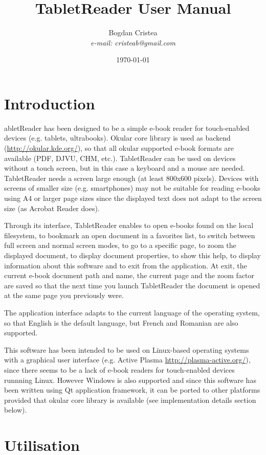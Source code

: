\documentclass[journal,12pt]{IEEEtran}
\title{TabletReader User Manual}
\author{Bogdan Cristea\\\textit{e-mail: cristeab@gmail.com}}
\date{\today}
\begin{document}
\maketitle

\section{Introduction}

abletReader has been designed to be a simple e-book reader for touch-enabled devices (e.g. tablets, ultrabooks). Okular core library is used as backend (\url{http://okular.kde.org/}), so that all okular supported e-book formats are available (PDF, DJVU, CHM, etc.). TabletReader can be used on devices without a touch screen, but in this case a keyboard and a mouse are needed. TabletReader needs a screen large enough (at least 800x600 pixels). Devices with screens of smaller size (e.g. smartphones) may not be suitable for reading e-books using A4 or larger page sizes since the displayed text does not adapt to the screen size (as Acrobat Reader does).

Through its interface, TabletReader enables to open e-books found on the local 
filesystem, to bookmark an open document in a favorites list, to switch between 
full screen and normal screen modes, to go to a specific page, to zoom the 
displayed document, to display document properties, to show this help, to 
display information about this software and to exit from the application. At 
exit, the current e-book document path and name, the current page and the zoom 
factor are saved so that the next time you launch TabletReader the document is 
opened at the same page you previously were. 

The application interface adapts to the current language of the operating system, so that English is the default language, but French and Romanian are also supported.

This software has been intended to be used on Linux-based operating systems with a graphical user interface (e.g. Active Plasma \url{http://plasma-active.org/}), since there seems to be a lack of e-book readers for touch-enabled devices runnning Linux. However Windows is also supported and since this software has been written using Qt application framework, it can be ported to other platforms provided that okular core library is available (see implementation details section below).

\newpage

\section{Utilisation}
\end{document}
